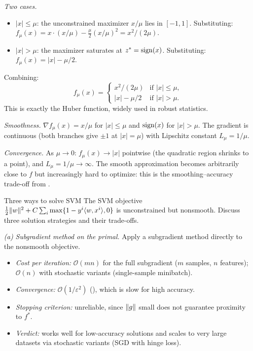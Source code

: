 \textit{Two cases.}
\begin{itemize}
	\item $|x| \leq \mu$: the unconstrained maximizer $x/\mu$ lies in $[-1, 1]$.
		Substituting: $f_\mu(x) = x \cdot (x/\mu) - \frac{\mu}{2}(x/\mu)^2 = x^2/(2\mu)$.
	\item $|x| > \mu$: the maximizer saturates at $z^* = \operatorname{sign}(x)$.
		Substituting: $f_\mu(x) = |x| - \mu/2$.
\end{itemize}
Combining:
\begin{equation}\label{eq:ex-huber}
	f_\mu(x) = \begin{cases} x^2/(2\mu) & \text{if } |x| \leq \mu, \\ |x| - \mu/2 & \text{if } |x| > \mu. \end{cases}
\end{equation}
This is exactly the Huber function, widely used in robust statistics.

\textit{Smoothness.}
$\nabla f_\mu(x) = x/\mu$ for $|x| \leq \mu$ and $\operatorname{sign}(x)$ for $|x| > \mu$.
The gradient is continuous (both branches give $\pm 1$ at $|x| = \mu$) with Lipschitz constant $L_\mu = 1/\mu$.

\textit{Convergence.}
As $\mu \to 0$: $f_\mu(x) \to |x|$ pointwise (the quadratic region shrinks to a point), and $L_\mu = 1/\mu \to \infty$.
The smooth approximation becomes arbitrarily close to $f$ but increasingly hard to optimize: this is the smoothing--accuracy trade-off from .

\begin{exercise}{Three ways to solve SVM}\label{ex:svm-unconstrained}
	The SVM objective $\frac{1}{2}\lVert w\rVert^2 + C\sum_i \max\{1 - y^i\langle w, x^i\rangle, 0\}$ is unconstrained but nonsmooth.
	Discuss three solution strategies and their trade-offs.
\end{exercise}

\solution
\textit{(a) Subgradient method on the primal.}
Apply a subgradient method directly to the nonsmooth objective.
\begin{itemize}
	\item \textit{Cost per iteration:} $\mathcal{O}(mn)$ for the full subgradient ($m$ samples, $n$ features); $\mathcal{O}(n)$ with stochastic variants (single-sample minibatch).
	\item \textit{Convergence:} $\mathcal{O}(1/\varepsilon^2)$ (), which is slow for high accuracy.
	\item \textit{Stopping criterion:} unreliable, since $\lVert g\rVert$ small does not guarantee proximity to $f^*$.
	\item \textit{Verdict:} works well for low-accuracy solutions and scales to very large datasets via stochastic variants (SGD with hinge loss).
\end{itemize}

